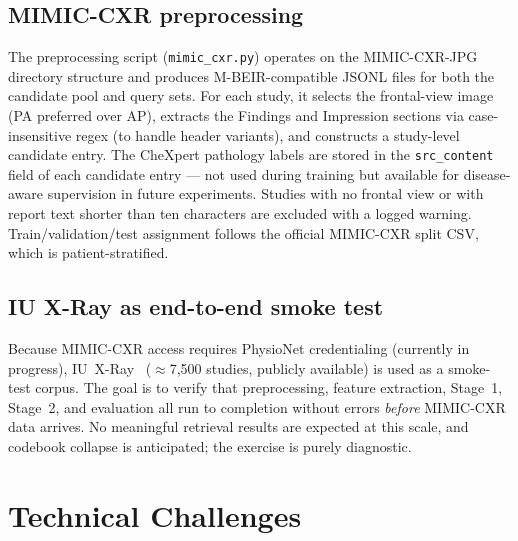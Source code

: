 \documentclass[11pt,a4paper]{article}
\begin{document}
\subsection{MIMIC-CXR preprocessing}

The preprocessing script (\texttt{mimic\_cxr.py}) operates on the MIMIC-CXR-JPG
directory structure and produces M-BEIR-compatible JSONL files for both the
candidate pool and query sets.
For each study, it selects the frontal-view image (PA preferred over AP),
extracts the Findings and Impression sections via case-insensitive regex (to
handle header variants), and constructs a study-level candidate entry.
The CheXpert pathology labels are stored in the \texttt{src\_content} field of
each candidate entry --- not used during training but available for
disease-aware supervision in future experiments.
Studies with no frontal view or with report text shorter than ten characters
are excluded with a logged warning.
Train/validation/test assignment follows the official MIMIC-CXR split CSV,
which is patient-stratified.

\subsection{IU X-Ray as end-to-end smoke test}

Because MIMIC-CXR access requires PhysioNet credentialing (currently in
progress), IU~X-Ray~\cite{iuxray2015} ($\approx$7,500 studies, publicly available)
is used as a smoke-test corpus.
The goal is to verify that preprocessing, feature extraction, Stage~1, Stage~2,
and evaluation all run to completion without errors \emph{before} MIMIC-CXR
data arrives.
No meaningful retrieval results are expected at this scale, and codebook
collapse is anticipated; the exercise is purely diagnostic.

\section{Technical Challenges}
\end{document}
